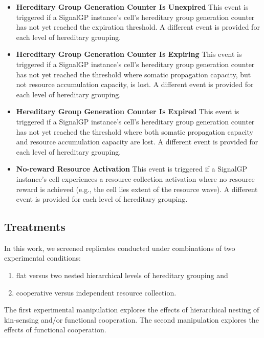 \begin{itemize}
\item \textbf{Hereditary Group Generation Counter Is Unexpired}
This event is triggered if a SignalGP instance's cell's hereditary group generation counter has not yet reached the expiration threshold.
A different event is provided for each level of hereditary grouping.
\item \textbf{Hereditary Group Generation Counter Is Expiring}
This event is triggered if a SignalGP instance's cell's hereditary group generation counter has not yet reached the threshold where somatic propagation capacity, but not resource accumulation capacity, is lost.
A different event is provided for each level of hereditary grouping.
\item \textbf{Hereditary Group Generation Counter Is Expired}
This event is triggered if a SignalGP instance's cell's hereditary group generation counter has not yet reached the threshold where both somatic propagation capacity and resource accumulation capacity are lost.
A different event is provided for each level of hereditary grouping.
\item \textbf{No-reward Resource Activation}
This event is triggered if a SignalGP instance's cell experiences a resource collection activation where no resource reward is achieved (e.g., the cell lies extent of the resource wave).
A different event is provided for each level of hereditary grouping.
\end{itemize}

\subsection{Treatments} \label{sup:treatments}





In this work, we screened replicates conducted under combinations of two experimental conditions:
\begin{enumerate}
\item flat versus two nested hierarchical levels of hereditary grouping and
\item cooperative versus independent resource collection.
\end{enumerate}

The first experimental manipulation explores the effects of hierarchical nesting of kin-sensing and/or functional cooperation.
The second manipulation explores the effects of functional cooperation.

